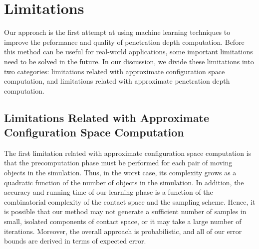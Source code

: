 \section{Limitations}
Our approach is the first attempt at using machine learning techniques to improve the peformance and quality of penetration depth computation. Before this method can be useful for real-world applications, some important limitations need to be solved in the future. In our discussion, we divide these limitations into two categories: limitations related with approximate configuration space computation, and limitations related with approximate penetration depth computation.

\subsection{Limitations Related with Approximate Configuration Space Computation}
The first limitation related with approximate configuration space computation is that the precomputation phase must be performed for each pair of moving objects in the simulation. Thus, in the worst case, its complexity grows as a quadratic function of the number of objects in the simulation. In addition, the accuracy and running time of our learning phase is a function of the combinatorial complexity of the contact
space and the sampling scheme. Hence, it is possible that our method may not generate a sufficient number of samples in small,
isolated components of contact space, or it may take a large number of iterations.
Moreover, the overall approach is probabilistic, and all of our error bounds are derived in terms of expected error.

